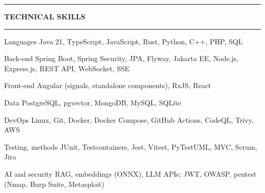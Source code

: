 \documentclass[10pt,a4paper]{article}
\newlength{\gut}\setlength{\gut}{2.7cm}
\newcommand{\cvsection}[1]{%
  \vspace{4pt}%
  {\color{ink}\rule[-0.5pt]{2.4pt}{9pt}}\hspace{6pt}%
  {\small\bfseries\MakeUppercase{#1}}\hspace{8pt}%
  {\color{hair}\leaders\hrule height 3.4pt depth -2.9pt\hfill}\par
  \vspace{2pt}}
\newenvironment{grid}{%
  \begin{list}{}{\setlength{\leftmargin}{\gut}\setlength{\labelwidth}{\gut-8pt}%
    \setlength{\labelsep}{8pt}\setlength{\itemsep}{2.5pt}\setlength{\topsep}{0pt}%
    \setlength{\parsep}{0pt}\setlength{\partopsep}{0pt}%
    \renewcommand{\makelabel}[1]{\makebox[\labelwidth][l]{\small\color{soft}##1}}}}
  {\end{list}}
\newcommand{\sep}{\hspace{0.5em}{\color{hair}|}\hspace{0.5em}}
\begin{document}
\cvsection{Technical skills}
\begin{grid}\setlength{\itemsep}{1.5pt}
  \item[Languages]      {\small Java 21, TypeScript, JavaScript, Rust, Python, C++, PHP, SQL}
  \item[Back-end]       {\small Spring Boot, Spring Security, JPA, Flyway, Jakarta EE, Node.js, Express.js, REST API, WebSocket, SSE}
  \item[Front-end]      {\small Angular (signals, standalone components), RxJS, React}
  \item[Data]           {\small PostgreSQL, pgvector, MongoDB, MySQL, SQLite}
  \item[DevOps]         {\small Linux, Git, Docker, Docker Compose, GitHub Actions, CodeQL, Trivy, AWS}
  \item[Testing, methods]{\small JUnit, Testcontainers, Jest, Vitest, PyTest\sep UML, MVC, Scrum, Jira}
  \item[AI and security]{\small RAG, embeddings (ONNX), LLM APIs; JWT, OWASP, pentest (Nmap, Burp Suite, Metasploit)}
\end{grid}
\end{document}
